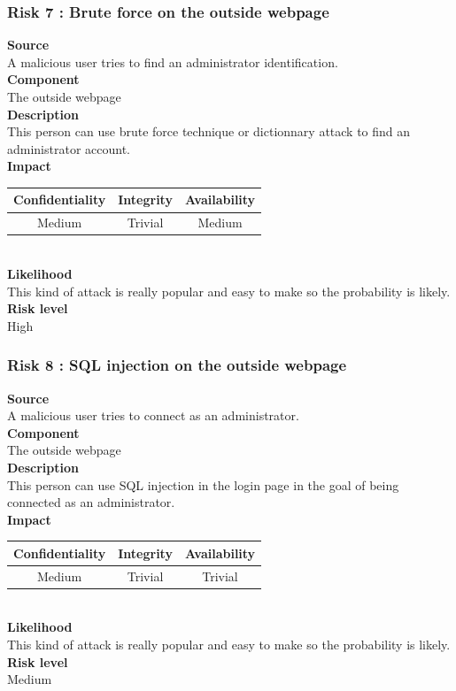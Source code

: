 \documentclass[a4paper,11pt]{article}
\begin{document}
\subsubsection{Risk 7 : Brute force on the outside webpage }
\textbf{Source} \\A malicious user tries to find an administrator identification.\\
\textbf{Component} \\The outside webpage\\
\textbf{Description}\\This person can use brute force technique or dictionnary attack to find an administrator account. \\
\textbf{Impact}\\
\begin{tabular}{|c|c|c|}
\hline
Confidentiality & Integrity & Availability \\
\hline
Medium & Trivial & Medium \\
\hline
\end{tabular}\\
\textbf{Likelihood}\\ This kind of attack is really popular and easy to make so the probability is likely.\\
\textbf{Risk level}\\High\\

\subsubsection{Risk 8 : SQL injection on the outside webpage }
\textbf{Source} \\A malicious user tries to connect as an administrator.\\
\textbf{Component} \\The outside webpage\\
\textbf{Description}\\This person can use SQL injection in the login page in the goal of being connected as an administrator. \\
\textbf{Impact}\\
\begin{tabular}{|c|c|c|}
\hline
Confidentiality & Integrity & Availability \\
\hline
Medium & Trivial & Trivial \\
\hline
\end{tabular}\\
\textbf{Likelihood}\\ This kind of attack is really popular and easy to make so the probability is likely.\\
\textbf{Risk level}\\Medium\\
\end{document}
